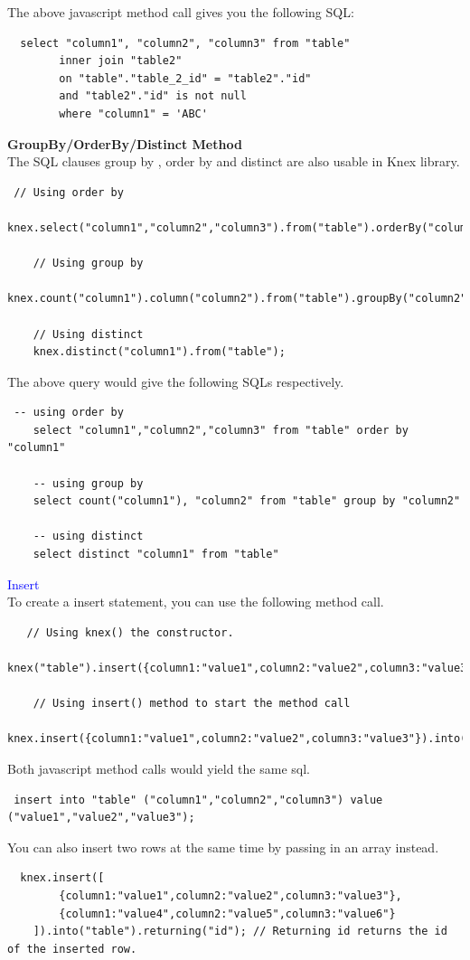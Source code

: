 \documentclass[a4paper]{article}
\begin{document}
The above javascript method call gives you the following SQL:
\begin{lstlisting}
  select "column1", "column2", "column3" from "table" 
        inner join "table2" 
        on "table"."table_2_id" = "table2"."id" 
        and "table2"."id" is not null 
        where "column1" = 'ABC'
\end{lstlisting}
\textbf{GroupBy/OrderBy/Distinct Method}\\
The SQL clauses group by , order by and distinct are also usable in Knex library.
\begin{lstlisting}
 // Using order by
    knex.select("column1","column2","column3").from("table").orderBy("column1");

    // Using group by
    knex.count("column1").column("column2").from("table").groupBy("column2")

    // Using distinct 
    knex.distinct("column1").from("table");
\end{lstlisting}
The above query would give the following SQLs respectively.
\begin{lstlisting}
 -- using order by 
    select "column1","column2","column3" from "table" order by "column1"

    -- using group by
    select count("column1"), "column2" from "table" group by "column2"

    -- using distinct
    select distinct "column1" from "table"
\end{lstlisting}

\textcolor{blue}{Insert}\\
To create a insert statement, you can use the following method call.
\begin{lstlisting}
   // Using knex() the constructor.
    knex("table").insert({column1:"value1",column2:"value2",column3:"value3"})

    // Using insert() method to start the method call
    knex.insert({column1:"value1",column2:"value2",column3:"value3"}).into("table")
\end{lstlisting}
Both javascript method calls would yield the same sql.
\begin{lstlisting}
 insert into "table" ("column1","column2","column3") value ("value1","value2","value3");
\end{lstlisting}
You can also insert two rows at the same time by passing in an array instead.
\begin{lstlisting}
  knex.insert([
        {column1:"value1",column2:"value2",column3:"value3"},
        {column1:"value4",column2:"value5",column3:"value6"}
    ]).into("table").returning("id"); // Returning id returns the id of the inserted row.
\end{lstlisting}
\end{document}
